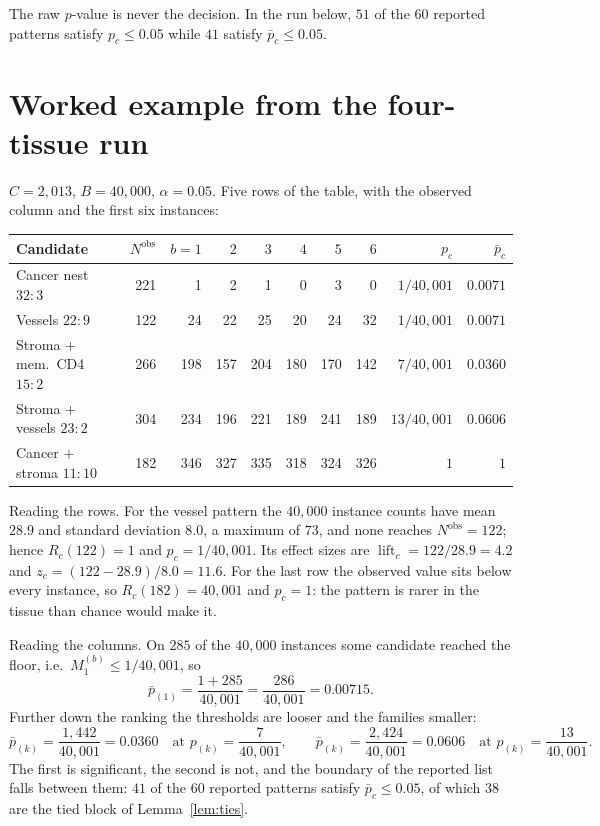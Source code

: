 \documentclass[11pt,a4paper]{article}
\theoremstyle{remark}
\newcommand{\obs}{\mathrm{obs}}
\newcommand{\adj}{\bar p}
\newcommand{\lift}{\operatorname{lift}}
\begin{document}
The raw $p$-value is never the decision. In the run below, $51$ of the $60$
reported patterns satisfy $p_c\le0.05$ while $41$ satisfy $\adj_c\le0.05$.

\section{Worked example from the four-tissue run}

$C=2{,}013$, $B=40{,}000$, $\alpha=0.05$. Five rows of the table, with the
observed column and the first six instances:

\begin{center}
\small
\begin{tabular}{lrrrrrrrrr}
\toprule
Candidate & $N^{\obs}$ & $b{=}1$ & $2$ & $3$ & $4$ & $5$ & $6$ & $p_c$ & $\adj_c$ \\
\midrule
Cancer nest $32{:}3$        & 221 & 1 & 2 & 1 & 0 & 3 & 0 & $1/40{,}001$ & $0.0071$ \\
Vessels $22{:}9$            & 122 & 24 & 22 & 25 & 20 & 24 & 32 & $1/40{,}001$ & $0.0071$ \\
Stroma $+$ mem.\ CD4 $15{:}2$ & 266 & 198 & 157 & 204 & 180 & 170 & 142 & $7/40{,}001$ & $0.0360$ \\
Stroma $+$ vessels $23{:}2$ & 304 & 234 & 196 & 221 & 189 & 241 & 189 & $13/40{,}001$ & $0.0606$ \\
Cancer $+$ stroma $11{:}10$ & 182 & 346 & 327 & 335 & 318 & 324 & 326 & $1$ & $1$ \\
\bottomrule
\end{tabular}
\end{center}

Reading the rows. For the vessel pattern the $40{,}000$ instance counts have
mean $28.9$ and standard deviation $8.0$, a maximum of $73$, and none reaches
$N^{\obs}=122$; hence $R_c(122)=1$ and $p_c=1/40{,}001$. Its effect sizes are
$\lift_c=122/28.9=4.2$ and $z_c=(122-28.9)/8.0=11.6$. For the last row the
observed value sits below every instance, so $R_c(182)=40{,}001$ and $p_c=1$:
the pattern is rarer in the tissue than chance would make it.

Reading the columns. On $285$ of the $40{,}000$ instances some candidate
reached the floor, i.e.\ $M^{(b)}_1\le 1/40{,}001$, so
\[
  \adj_{(1)}=\frac{1+285}{40{,}001}=\frac{286}{40{,}001}=0.00715 .
\]
Further down the ranking the thresholds are looser and the families smaller:
\[
  \adj_{(k)}=\frac{1{,}442}{40{,}001}=0.0360
  \quad\text{at } p_{(k)}=\frac{7}{40{,}001},
  \qquad
  \adj_{(k)}=\frac{2{,}424}{40{,}001}=0.0606
  \quad\text{at } p_{(k)}=\frac{13}{40{,}001}.
\]
The first is significant, the second is not, and the boundary of the reported
list falls between them: $41$ of the $60$ reported patterns satisfy
$\adj_c\le0.05$, of which $38$ are the tied block of Lemma~\ref{lem:ties}.
\end{document}
